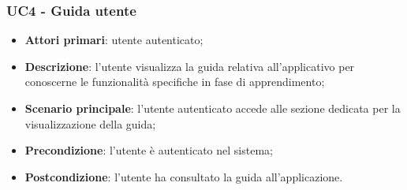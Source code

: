 \subsubsection{UC4 - Guida utente}
\begin{itemize}
	\item \textbf{Attori primari}: utente autenticato;
	\item \textbf{Descrizione}: l'utente visualizza la guida relativa all'applicativo per conoscerne le funzionalità specifiche in fase di apprendimento;
	\item \textbf{Scenario principale}: l'utente autenticato accede alle sezione dedicata per la visualizzazione della guida;
	\item \textbf{Precondizione}: l'utente è autenticato nel sistema;
	\item \textbf{Postcondizione}: l'utente ha consultato la guida all'applicazione.
\end{itemize}   